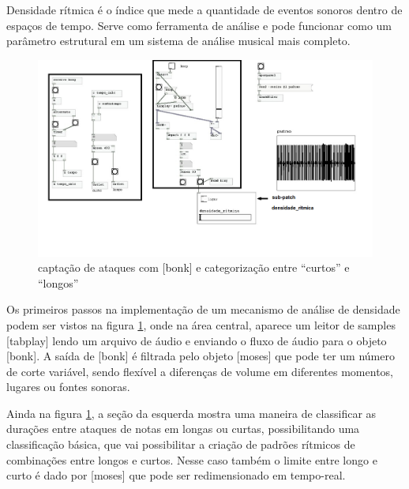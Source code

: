 \documentclass{ppgmus}
\begin{document}
Densidade rítmica é o índice que mede a quantidade de eventos sonoros
dentro de espaços de tempo. Serve como ferramenta de análise e pode funcionar
como um parâmetro estrutural em um sistema de análise musical mais completo.


\begin{figure}
\includegraphics[scale=.5]{prot5b}
\caption{captação de ataques com [bonk\texttildelow] e categorização entre ``curtos'' e ``longos''}
\label{prot5b}
\end{figure}

Os primeiros passos na implementação de um mecanismo de análise de densidade podem ser vistos na figura \ref{prot5b},
onde na área central, aparece um leitor de samples [tabplay\texttildelow] lendo um arquivo de
áudio e enviando o fluxo de áudio para o objeto [bonk\texttildelow]. A saída de [bonk\texttildelow] é filtrada
pelo objeto [moses] que pode ter um número de corte variável, sendo flexível a diferenças
de volume em diferentes momentos, lugares ou fontes sonoras.

Ainda na figura \ref{prot5b}, a seção da esquerda mostra uma maneira de classificar as durações
entre ataques de notas em longas ou curtas, possibilitando uma classificação básica,
que vai possibilitar a criação de padrões rítmicos de combinações entre longos e curtos.
Nesse caso também o limite entre longo e curto é dado por [moses] que pode ser redimensionado
em tempo-real. 
\end{document}

